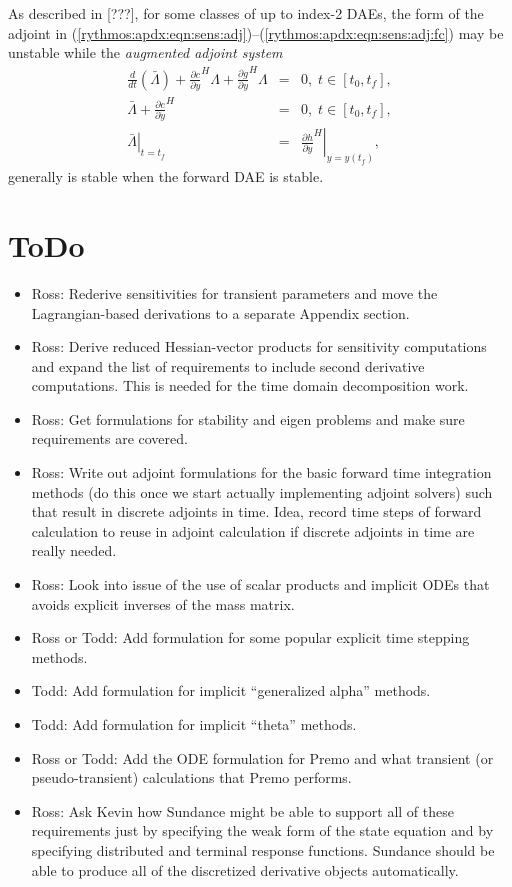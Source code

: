 \documentclass[pdf,ps2pdf,11pt]{SANDreport}
\begin{document}
As described in [???], for some classes of up to index-2 DAEs, the form of the
adjoint in
(\ref{rythmos:apdx:eqn:sens:adj})--(\ref{rythmos:apdx:eqn:sens:adj:fc}) may be
unstable while the {}\textit{augmented adjoint system}
%
\begin{eqnarray}
\frac{d}{dt}\left( \bar{\Lambda} \right)
+  \frac{\partial c}{\partial y}^H \Lambda + \frac{\partial g}{\partial y}^H \Lambda
& = & 0, \; t \in \left[ t_0, t_f \right],
\label{rythmos:apdx:eqn:sens:aug-adj-de} \\
\bar{\Lambda} + \frac{\partial c}{\partial \dot{y}}^H
& = & 0, \; t \in \left[ t_0, t_f \right],
\label{rythmos:apdx:eqn:sens:aug-adj-ae} \\
\left. \bar{\Lambda} \right|_{t=t_f}
& = & \left. \frac{\partial h}{\partial y}^H \right|_{y=y(t_f)},
\label{rythmos:apdx:eqn:sens:aug-adj:fc}
\end{eqnarray}
%
generally is stable when the forward DAE is stable.

\section{ToDo}

\begin{itemize}
%
{}\item Ross: Rederive sensitivities for transient parameters and move the
Lagrangian-based derivations to a separate Appendix section.
%
{}\item Ross: Derive reduced Hessian-vector products for sensitivity
computations and expand the list of requirements to include second derivative
computations.  This is needed for the time domain decomposition work.
%
{}\item Ross: Get formulations for stability and eigen problems and make sure
requirements are covered.
%
{}\item Ross: Write out adjoint formulations for the basic forward time
integration methods (do this once we start actually implementing adjoint
solvers) such that result in discrete adjoints in time.  Idea, record time
steps of forward calculation to reuse in adjoint calculation if discrete
adjoints in time are really needed.
%
{}\item Ross: Look into issue of the use of scalar products and implicit ODEs that
avoids explicit inverses of the mass matrix.
%
{}\item Ross or Todd: Add formulation for some popular explicit time stepping
methods.
%
{}\item Todd: Add formulation for implicit ``generalized alpha'' methods.
%
{}\item Todd: Add formulation for implicit ``theta'' methods.
%
{}\item Ross or Todd: Add the ODE formulation for Premo and what transient (or
pseudo-transient) calculations that Premo performs.
%
{}\item Ross: Ask Kevin how Sundance might be able to support all of these
requirements just by specifying the weak form of the state equation and by
specifying distributed and terminal response functions.  Sundance should be
able to produce all of the discretized derivative objects automatically.
%
\end{itemize}
\end{document}
